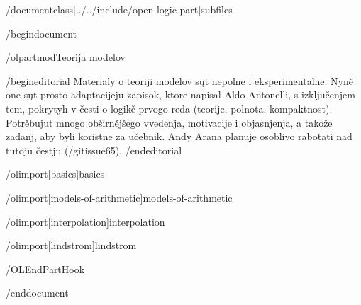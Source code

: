 
/documentclass[../../include/open-logic-part]{subfiles}

/begin{document}


/olpart{mod}{Teorija modelov}

/begin{editorial}
  Materialy o teoriji modelov sųt nepolne i eksperimentalne. Nyně
  one sųt prosto adaptacijeju zapisok, ktore napisal Aldo Antonelli,
  s izključenjem tem, pokrytyh v česti o logikě prvogo reda
  (teorije, polnota, kompaktnost). Potrěbujut mnogo obširnějšego
  vvedenja, motivacije i objasnjenja, a takože zadanj, aby byli
  koristne za učebnik. Andy Arana planuje osoblivo rabotati nad
  tutoju čestju (/gitissue{65}).
/end{editorial}

/olimport[basics]{basics}

/olimport[models-of-arithmetic]{models-of-arithmetic}

/olimport[interpolation]{interpolation}

/olimport[lindstrom]{lindstrom}

/OLEndPartHook

/end{document}
